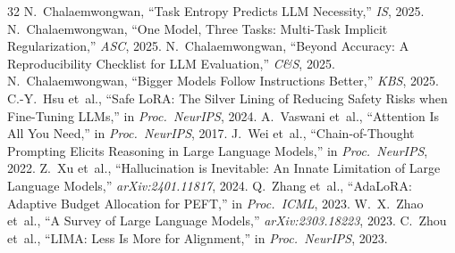 \documentclass[journal]{IEEEtran}
\begin{document}
\begin{thebibliography}{32}
 N.~Chalaemwongwan, ``Task Entropy Predicts LLM Necessity,'' \emph{IS}, 2025.
 N.~Chalaemwongwan, ``One Model, Three Tasks: Multi-Task Implicit Regularization,'' \emph{ASC}, 2025.
 N.~Chalaemwongwan, ``Beyond Accuracy: A Reproducibility Checklist for LLM Evaluation,'' \emph{C\&S}, 2025.
 N.~Chalaemwongwan, ``Bigger Models Follow Instructions Better,'' \emph{KBS}, 2025.
 C.-Y.~Hsu et~al., ``Safe LoRA: The Silver Lining of Reducing Safety Risks when Fine-Tuning LLMs,'' in \emph{Proc.\ NeurIPS}, 2024.
 A.~Vaswani et~al., ``Attention Is All You Need,'' in \emph{Proc.\ NeurIPS}, 2017.
 J.~Wei et~al., ``Chain-of-Thought Prompting Elicits Reasoning in Large Language Models,'' in \emph{Proc.\ NeurIPS}, 2022.
 Z.~Xu et~al., ``Hallucination is Inevitable: An Innate Limitation of Large Language Models,'' \emph{arXiv:2401.11817}, 2024.
 Q.~Zhang et~al., ``AdaLoRA: Adaptive Budget Allocation for PEFT,'' in \emph{Proc.\ ICML}, 2023.
 W.~X.~Zhao et~al., ``A Survey of Large Language Models,'' \emph{arXiv:2303.18223}, 2023.
 C.~Zhou et~al., ``LIMA: Less Is More for Alignment,'' in \emph{Proc.\ NeurIPS}, 2023.
\end{thebibliography}
\end{document}
